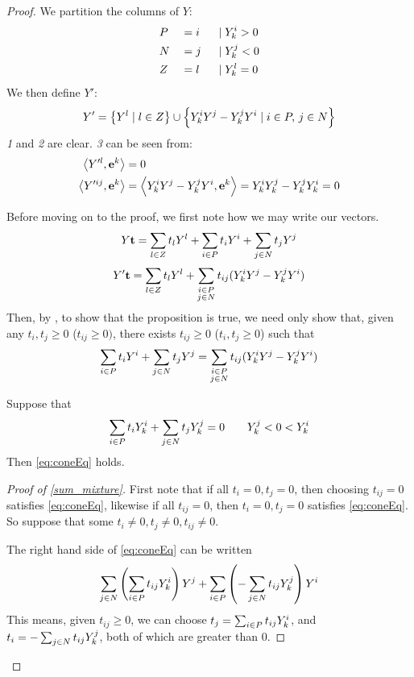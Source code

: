 \begin{proof}
	We partition the columns of $ Y$:
	\begin{alignat*}{3}
		 & P &  & = i \; & \;|\; & Y^i_{k} > 0 \\
		 & N &  & = j \; & \;|\; & Y^j_{k} < 0 \\
		 & Z &  & = l \; & \;|\; & Y^l_{k} = 0
	\end{alignat*}
	We then define $ Y'$:
	\[  Y' = \left\{ Y^l \;|\; l \in Z\right\} \cup
		\left\{Y^i_{k} Y^j - Y^j_{k} Y^i \;|\; i \in P,\, j\in N\right\} \]
	\textit{1} and \textit{2} are clear.  \textit{3} can be seen from:
	\begin{align}
		\left\langle Y'^l, \mathbf{e}^k \right\rangle    & = 0 \nonumber                                                                \\
		\left\langle Y'^{ij}, \mathbf{e}^k \right\rangle & = \left\langle Y^i_{k} Y^j - Y^j_{k} Y^i, \mathbf{e}^k \right\rangle = Y^i_{k} Y^j_{k} - Y^j_{k} Y^i_{k} = 0 \label{eq:hdropZrows}
	\end{align}

	Before moving on to the proof, we first note how we may write our vectors.
	\[  Y\mathbf{t} = \sum_{l\in Z} t_l  Y^l + \sum_{i\in P} t_i  Y^i + \sum_{j\in N} t_j  Y^j \]
	\[  Y'\mathbf{t} = \sum_{l\in Z} t_l  Y^l + \sum_{\substack{i\in P \\ j\in N}} t_{ij} (Y^i_{k} Y^j - Y^j_{k} Y^i) \]
	Then, by , to show that the proposition is true, we need only show that, given any $t_i, t_j \geq 0$ ($t_{ij} \geq 0)$, there exists $t_{ij} \geq 0$ ($t_i, t_j \geq 0$) such that
	\begin{equation} \label{eq:coneEq}
		\sum_{i\in P} t_i  Y^i + \sum_{j\in N} t_j  Y^j = \sum_{\substack{i\in P \\ j\in N}} t_{ij} (Y^i_{k} Y^j - Y^j_{k} Y^i)
	\end{equation}

	\newcommand{\coneEqSat}{\quad\mathrm{\;such\; that\; \eqref{eq:coneEq}\; holds}}
	\begin{Prop}\label{sum_mixture}
		Suppose that
		\[ \sum_{i\in P} t_i  Y^i_{k} + \sum_{j\in N} t_j  Y^j_{k} = 0\quad\quad Y^j_{k} < 0 < Y^i_{k} \]
		Then \eqref{eq:coneEq} holds.
	\end{Prop}

	\begin{proof}[Proof of \cref{sum_mixture}]
		First note that if all $t_i = 0,t_j = 0$, then choosing $t_{ij} = 0$ satisfies \eqref{eq:coneEq}, likewise if all $t_{ij} = 0$, then $t_i = 0, t_j = 0$ satisfies \eqref{eq:coneEq}.  So suppose that some $t_i \neq 0, t_j \neq 0, t_{ij} \neq 0$.

		The right hand side of \eqref{eq:coneEq} can be written
		\[ \sum_{j\in N} \left(\sum_{i\in P} t_{ij}Y^i_{k}\right) Y^j +
			\sum_{i\in P} \left(-\sum_{j\in N} t_{ij}Y^j_{k}\right) Y^i \]
		This means, given $t_{ij} \geq 0$, we can choose $t_j = \sum_{i\in P} t_{ij}Y^i_{k}$, and $t_i = -\sum_{j\in N} t_{ij}Y^j_{k}$, both of which are greater than $0$.


\end{proof}
\end{proof}
